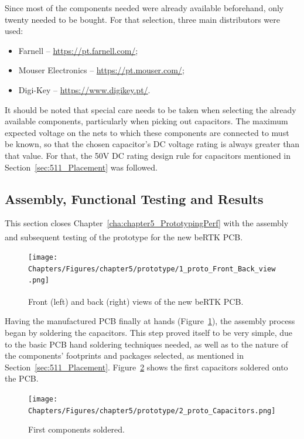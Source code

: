 Since most of the components needed were already available beforehand, only twenty needed to be bought. For that selection, three main distributors were used:
\begin{itemize}
	\item Farnell -- \url{https://pt.farnell.com/};
	\item Mouser Electronics -- \url{https://pt.mouser.com/};
	\item Digi-Key -- \url{https://www.digikey.pt/}.
\end{itemize}

It should be noted that special care needs to be taken when selecting the already available components, particularly when picking out capacitors. The maximum expected voltage on the nets to which these components are connected to must be known, so that the chosen capacitor's DC voltage rating is always greater than that value. For that, the 50V DC rating design rule for capacitors mentioned in Section~\ref{sec:511_Placement} was followed.


\subsection{Assembly, Functional Testing and Results}\label{sec:533_PrototypeAssembly}

This section closes Chapter~\ref{cha:chapter5_PrototypingPerf} with the assembly and subsequent testing of the prototype for the new beRTK\textsuperscript{\textregistered} PCB.

\begin{figure}[h]
	\centering
	\texttt{[image: Chapters/Figures/chapter5/prototype/1\_proto\_Front\_Back\_view.png]}
	\caption{Front (left) and back (right) views of the new beRTK\textsuperscript{\textregistered} PCB.}
	\label{fig:1_proto_Front_Back_view}
\end{figure}%

Having the manufactured PCB finally at hands (Figure~\ref{fig:1_proto_Front_Back_view}), the assembly process began by soldering the capacitors. This step proved itself to be very simple, due to the basic PCB hand soldering techniques needed, as well as to the nature of the components' footprints and packages selected, as mentioned in Section~\ref{sec:511_Placement}. Figure~\ref{fig:2_proto_Capacitors} shows the first capacitors soldered onto the PCB.

\begin{figure}[h]
	\centering
	\texttt{[image: Chapters/Figures/chapter5/prototype/2\_proto\_Capacitors.png]}
	\caption{First components soldered.}
	\label{fig:2_proto_Capacitors}
\end{figure}%

